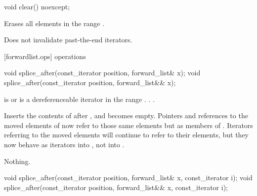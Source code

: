 %
%
\begin{itemdecl}
void clear() noexcept;
\end{itemdecl}

\begin{itemdescr}
\pnum
\effects Erases all elements in the range .

\pnum
\remarks Does not invalidate past-the-end iterators.
\end{itemdescr}

[forwardlist.ops]{ operations}

%
%
\begin{itemdecl}
void splice_after(const_iterator position, forward_list& x);
void splice_after(const_iterator position, forward_list&& x);
\end{itemdecl}

\begin{itemdescr}
\pnum
\requires {} is  or is a dereferenceable
iterator in the range .
.
.

\pnum
\effects Inserts the contents of  after
, and  becomes empty. Pointers and references to the moved
elements of  now refer to those same elements but as members of .
Iterators referring to the moved elements will continue to refer to their elements, but
they now behave as iterators into , not into .

\pnum
\throws Nothing.

\pnum
\complexity {}
\end{itemdescr}

%
%
\begin{itemdecl}
void splice_after(const_iterator position, forward_list& x, const_iterator i);
void splice_after(const_iterator position, forward_list&& x, const_iterator i);
\end{itemdecl}


